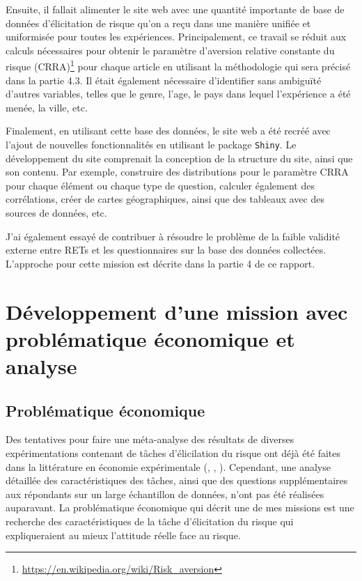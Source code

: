 \documentclass[12pt]{article}
\begin{document}
Ensuite, il fallait alimenter le site web avec une quantité importante
de base de données d'élicitation de risque qu'on a reçu dans une manière
unifiée et uniformisée pour toutes les expériences. Principalement, ce
travail se réduit aux calculs nécessaires pour obtenir le paramètre
d'aversion relative constante du risque (CRRA)\footnote{\url{https://en.wikipedia.org/wiki/Risk_aversion}}
pour chaque article en utilisant la méthodologie qui sera précisé dans
la partie 4.3. Il était également nécessaire d'identifier sans ambiguïté
d'autres variables, telles que le genre, l'age, le pays dans lequel
l'expérience a été menée, la ville, etc.

Finalement, en utilisant cette base des données, le site web a été
recréé avec l'ajout de nouvelles fonctionnalités en utilisant le package
\texttt{Shiny}. Le développement du site comprenait la conception de la
structure du site, ainsi que son contenu. Par exemple, construire des
distributions pour le paramètre CRRA pour chaque élément ou chaque type
de question, calculer également des corrélations, créer de cartes
géographiques, ainsi que des tableaux avec des sources de données, etc.

J'ai également essayé de contribuer à résoudre le problème de la faible
validité externe entre RETs et les questionnaires sur la base des
données collectées. L'approche pour cette mission est décrite dans la
partie 4 de ce rapport.

\section{Développement d’une mission avec problématique économique et analyse}
\label{sec:fourth}

\subsection{Problématique économique}

Des tentatives pour faire une méta-analyse des résultats de diverses
expérimentations contenant de tâches d'élicilation du risque ont déjà
été faites dans la littérature en économie expérimentale
(\citet{CroFil2013b}, \citet{Alserda2019}, \citet{Bokern2021}).
Cependant, une analyse détaillée des caractéristiques des tâches, ainsi
que des questions supplémentaires aux répondants sur un large
échantillon de données, n'ont pas été réalisées auparavant. La
problématique économique qui décrit une de mes missions est une
recherche des caractéristiques de la tâche d'élicitation du risque qui
expliqueraient au mieux l'attitude réelle face au risque.
\end{document}
